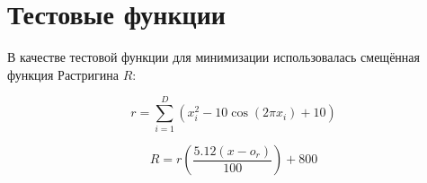 \section*{Тестовые функции}

В качестве тестовой функции для минимизации
использовалась смещённая функция Растригина $R$:

\begin{equation*}
    r = \sum_{i = 1}^{D}(x_i^2 - 10\cos(2 \pi x_i) + 10)
\end{equation*}

\begin{equation*}
    R = r\left(\frac{5.12 (x - o_r)}{100}\right) + 800
\end{equation*}


